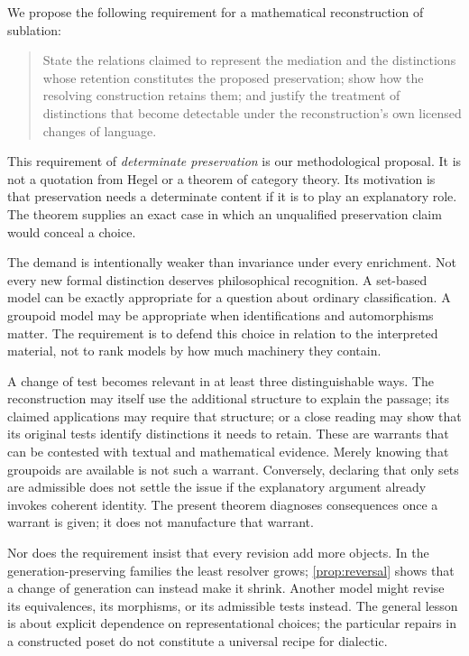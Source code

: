 We propose the following requirement for a mathematical reconstruction of
sublation:
\begin{quote}
State the relations claimed to represent the mediation and the distinctions
whose retention constitutes the proposed preservation; show how the
resolving construction retains them; and justify the treatment
of distinctions that become detectable under the reconstruction's own
licensed changes of language.
\end{quote}
This requirement of \emph{determinate preservation} is our methodological
proposal. It is not a quotation from Hegel or a theorem of category theory.
Its motivation is that preservation needs a determinate content if it is to
play an explanatory role. The theorem supplies an exact case in which an
unqualified preservation claim would conceal a choice.

The demand is intentionally weaker than invariance under every enrichment.
Not every new formal distinction deserves philosophical recognition. A set-based
model can be exactly appropriate for a question about ordinary
classification. A groupoid model may be appropriate when identifications
and automorphisms matter. The requirement is to defend this choice in
relation to the interpreted material, not to rank models by how much
machinery they contain.

A change of test becomes relevant in at least three distinguishable ways.
The reconstruction may itself use the additional structure to explain the
passage; its claimed applications may require that structure; or a close
reading may show that its original tests identify distinctions it needs to
retain. These are warrants that can be contested with textual and
mathematical evidence. Merely knowing that groupoids are available is not
such a warrant. Conversely, declaring that only sets are admissible does
not settle the issue if the explanatory argument already invokes coherent
identity. The present theorem diagnoses consequences once a warrant is
given; it does not manufacture that warrant.

Nor does the requirement insist that every revision add more objects.
In the generation-preserving families the least resolver grows;
\cref{prop:reversal} shows that a change of generation can instead
make it shrink. Another model might revise its equivalences, its morphisms,
or its admissible tests instead. The general lesson is about explicit
dependence on representational choices; the particular repairs in a
constructed poset do not constitute a universal recipe for dialectic.

